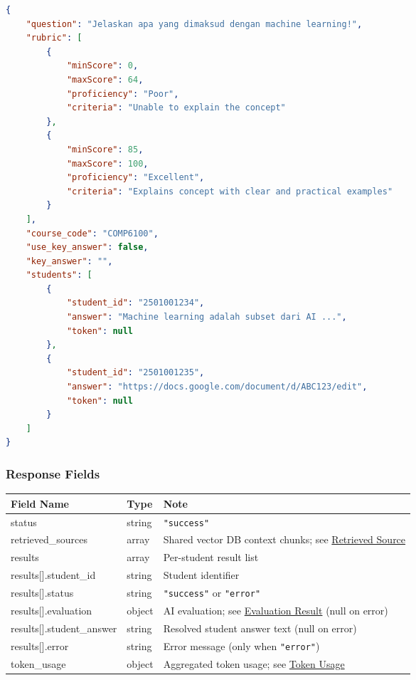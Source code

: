 \documentclass[11pt]{article}
\begin{document}
\begin{lstlisting}[language=json]
{
    "question": "Jelaskan apa yang dimaksud dengan machine learning!",
    "rubric": [
        {
            "minScore": 0,
            "maxScore": 64,
            "proficiency": "Poor",
            "criteria": "Unable to explain the concept"
        },
        {
            "minScore": 85,
            "maxScore": 100,
            "proficiency": "Excellent",
            "criteria": "Explains concept with clear and practical examples"
        }
    ],
    "course_code": "COMP6100",
    "use_key_answer": false,
    "key_answer": "",
    "students": [
        {
            "student_id": "2501001234",
            "answer": "Machine learning adalah subset dari AI ...",
            "token": null
        },
        {
            "student_id": "2501001235",
            "answer": "https://docs.google.com/document/d/ABC123/edit",
            "token": null
        }
    ]
}
\end{lstlisting}

\subsubsection{Response Fields}

\begin{longtable}{|p{5cm}|p{2cm}|p{7.7cm}|}
  \hline
  \rowcolor{tabheader}
  \textbf{Field Name} & \textbf{Type} & \textbf{Note} \\
  \hline
  \endhead
  status                    & string & \texttt{"success"} \\
  \hline
  retrieved\_sources        & array  & Shared vector DB context chunks; see \hyperref[sec:retrievedsource]{Retrieved Source} \\
  \hline
  results                   & array  & Per-student result list \\
  \hline
  results[].student\_id     & string & Student identifier \\
  \hline
  results[].status          & string & \texttt{"success"} or \texttt{"error"} \\
  \hline
  results[].evaluation      & object & AI evaluation; see \hyperref[sec:evaluationresult]{Evaluation Result} (null on error) \\
  \hline
  results[].student\_answer & string & Resolved student answer text (null on error) \\
  \hline
  results[].error           & string & Error message (only when \texttt{"error"}) \\
  \hline
  token\_usage              & object & Aggregated token usage; see \hyperref[sec:tokenusage]{Token Usage} \\
  \hline
\end{longtable}
\end{document}
